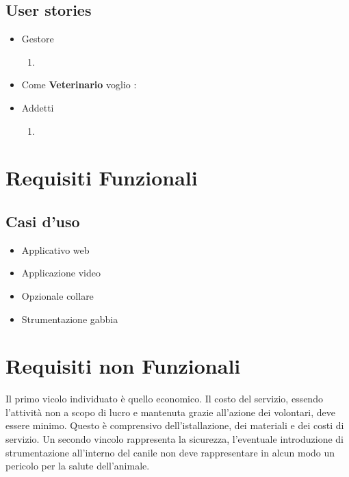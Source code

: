         \subsection{User stories}
        \begin{itemize}
            \item Gestore
            \begin{enumerate}
                \item 
            \end{enumerate}
            \item Come \textbf{Veterinario} voglio :
            
            \item Addetti
            \begin{enumerate}
                \item 
            \end{enumerate}
        \end{itemize}
	    
	\section{Requisiti Funzionali} %
	    \subsection{Casi d'uso}
	    \begin{itemize}
            \item Applicativo web 
            \item Applicazione video
            \item Opzionale collare
            \item Strumentazione gabbia
        \end{itemize}
        
	\section{Requisiti non Funzionali}
	Il primo vicolo individuato è quello economico. Il costo del servizio, essendo l'attività non a scopo di lucro e mantenuta grazie all'azione dei volontari, deve essere minimo. Questo è comprensivo dell'istallazione, dei materiali e dei costi di servizio.
	Un secondo vincolo rappresenta la sicurezza, l'eventuale introduzione di strumentazione all'interno del canile non deve rappresentare in alcun modo un pericolo per la salute dell'animale.
	
